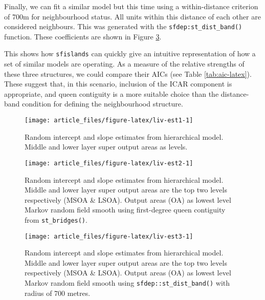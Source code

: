 Finally, we can fit a similar model but this time using a within-distance criterion of 700m for neighbourhood status. All units within this distance of each other are considered neighbours. This was generated with the \texttt{sfdep:st\_dist\_band()} function. These coefficients are shown in Figure \ref{fig:liv-est3}.

This shows how \texttt{sfislands} can quickly give an intuitive representation of how a set of similar models are operating. As a measure of the relative strengths of these three structures, we could compare their AICs (see Table \ref{tab:aic-latex}). These suggest that, in this scenario, inclusion of the ICAR component is appropriate, and queen contiguity is a more suitable choice than the distance-band condition for defining the neighbourhood structure.

\begin{figure}

{\centering \texttt{[image: article\_files/figure-latex/liv-est1-1]} 

}

\caption{Random intercept and slope estimates from hierarchical model. Middle and lower layer super output areas as levels. }\label{fig:liv-est1}
\end{figure}



\begin{figure}

{\centering \texttt{[image: article\_files/figure-latex/liv-est2-1]} 

}

\caption{Random intercept and slope estimates from hierarchical model. Middle and lower layer super output areas are the top two levels respectively (MSOA \& LSOA). Output areas (OA) as lowest level Markov random field smooth using first-degree queen contiguity from \texttt{st\_bridges()}.}\label{fig:liv-est2}
\end{figure}



\begin{figure}

{\centering \texttt{[image: article\_files/figure-latex/liv-est3-1]} 

}

\caption{Random intercept and slope estimates from hierarchical model. Middle and lower layer super output areas are the top two levels respectively (MSOA \& LSOA). Output areas (OA) as lowest level Markov random field smooth using \texttt{sfdep::st\_dist\_band()} with radius of 700 metres.}\label{fig:liv-est3}
\end{figure}

